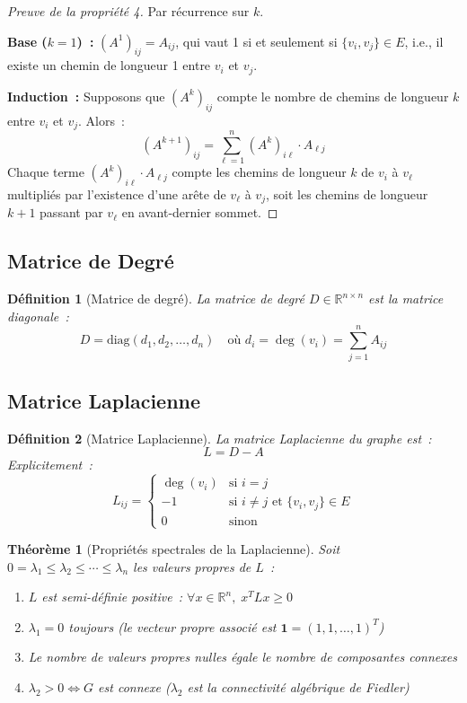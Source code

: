 \documentclass[12pt,a4paper]{article}
\newtheorem{definition}{Définition}[section]
\newtheorem{theoreme}{Théorème}[section]
\begin{document}
\begin{proof}[Preuve de la propriété 4]
Par récurrence sur $k$.

\textbf{Base ($k = 1$)~:} $(A^1)_{ij} = A_{ij}$, qui vaut 1 si et seulement si $\{v_i, v_j\} \in E$, i.e., il existe un chemin de longueur 1 entre $v_i$ et $v_j$.

\textbf{Induction~:} Supposons que $(A^k)_{ij}$ compte le nombre de chemins de longueur $k$ entre $v_i$ et $v_j$. Alors~:
\[
    (A^{k+1})_{ij} = \sum_{\ell=1}^{n} (A^k)_{i\ell} \cdot A_{\ell j}
\]
Chaque terme $(A^k)_{i\ell} \cdot A_{\ell j}$ compte les chemins de longueur $k$ de $v_i$ à $v_\ell$ multipliés par l'existence d'une arête de $v_\ell$ à $v_j$, soit les chemins de longueur $k+1$ passant par $v_\ell$ en avant-dernier sommet.
\end{proof}

\subsection{Matrice de Degré}

\begin{definition}[Matrice de degré]
La \emph{matrice de degré} $D \in \mathbb{R}^{n \times n}$ est la matrice diagonale~:
\[
    D = \text{diag}(d_1, d_2, \ldots, d_n) \quad \text{où } d_i = \deg(v_i) = \sum_{j=1}^{n} A_{ij}
\]
\end{definition}

\subsection{Matrice Laplacienne}

\begin{definition}[Matrice Laplacienne]
La \emph{matrice Laplacienne} du graphe est~:
\[
    L = D - A
\]
Explicitement~:
\[
    L_{ij} = \begin{cases}
        \deg(v_i)  & \text{si } i = j \\
        -1         & \text{si } i \neq j \text{ et } \{v_i, v_j\} \in E \\
        0          & \text{sinon}
    \end{cases}
\]
\end{definition}

\begin{theoreme}[Propriétés spectrales de la Laplacienne]
\label{thm:laplacian}
Soit $0 = \lambda_1 \leq \lambda_2 \leq \cdots \leq \lambda_n$ les valeurs propres de $L$~:
\begin{enumerate}
    \item $L$ est \emph{semi-définie positive}~: $\forall x \in \mathbb{R}^n, \; x^T L x \geq 0$
    \item $\lambda_1 = 0$ toujours (le vecteur propre associé est $\mathbf{1} = (1, 1, \ldots, 1)^T$)
    \item Le nombre de valeurs propres nulles égale le nombre de composantes connexes
    \item $\lambda_2 > 0 \Leftrightarrow G$ est connexe ($\lambda_2$ est la \emph{connectivité algébrique de Fiedler})
\end{enumerate}
\end{theoreme}
\end{document}
